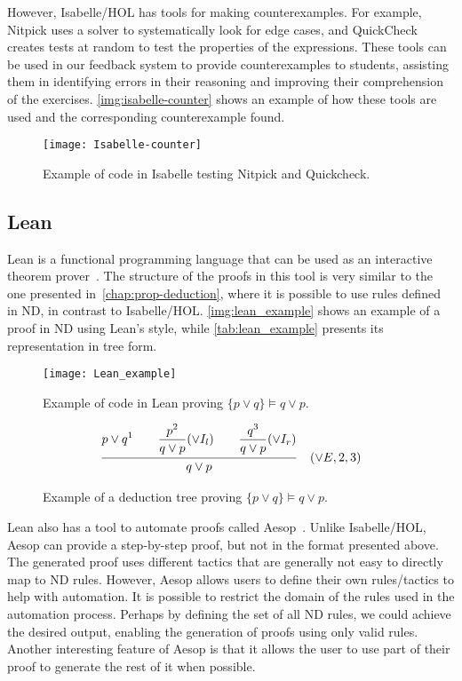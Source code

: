 However, Isabelle/HOL has tools for making counterexamples. For example, Nitpick uses a solver to systematically look for edge cases, and QuickCheck creates tests at random to test the properties of the expressions. These tools can be used in our feedback system to provide counterexamples to students, assisting them in identifying errors in their reasoning and improving their comprehension of the exercises. \autoref{img:isabelle-counter} shows an example of how these tools are used and the corresponding counterexample found.
\begin{figure}[htbp]
    \centering
    \texttt{[image: Isabelle-counter]}
    \caption{Example of code in Isabelle testing Nitpick and Quickcheck.}
    \label{img:isabelle-counter}
\end{figure}

\subsection{Lean}
\label{chap:lean}
Lean is a functional programming language that can be used as an interactive theorem prover~\cite{programming}. The structure of the proofs in this tool is very similar to the one presented in~\autoref{chap:prop-deduction}, where it is possible to use rules defined in \gls{ND}, in contrast to Isabelle/HOL. \autoref{img:lean_example} shows an example of a proof in \gls{ND} using Lean's style, while \autoref{tab:lean_example} presents its representation in tree form.

\begin{figure}[htbp]
    \centering
    \texttt{[image: Lean\_example]}
    \caption{Example of code in Lean proving \(\{p \lor q\} \models q \lor p \).}
    \label{img:lean_example}
\end{figure}

\begin{figure}[h!]
    \centering
        \[
            \frac{ {\displaystyle {p \lor q}^1 
            \quad \quad \displaystyle \frac{\displaystyle p^2}{q \lor p \strut} (\lor I_l) \strut}
            \quad \quad \displaystyle \frac{\displaystyle q^3}{q \lor p \strut} (\lor I_r) \strut}
            {\displaystyle q \lor p \strut} \quad (\vee E, 2, 3)
          \]
          \caption{Example of a deduction tree proving \(\{p \lor q\} \models q \lor p \).}
          \label{tab:lean_example}
      \end{figure}

Lean also has a tool to automate proofs called Aesop~\cite{leanprovercommunity_2021_github}. Unlike Isabelle/HOL, Aesop can provide a step-by-step proof, but not in the format presented above. The generated proof uses different tactics that are generally not easy to directly map to \gls{ND} rules. However, Aesop allows users to define their own rules/tactics to help with automation. It is possible to restrict the domain of the rules used in the automation process. Perhaps by defining the set of all \gls{ND} rules, we could achieve the desired output, enabling the generation of proofs using only valid rules. Another interesting feature of Aesop is that it allows the user to use part of their proof to generate the rest of it when possible.





